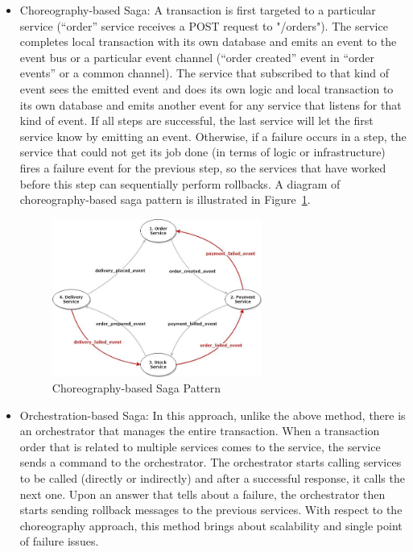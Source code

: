 \documentclass{Configuration_Files/PoliMi3i_thesis}
\begin{document}
\begin{itemize}
    \item Choreography-based Saga: A transaction is first targeted to a particular service (“order” service receives a POST request to "/orders").
    The service completes local transaction with its own database and emits an event to the event bus or a particular event channel (“order created” event in “order events” or a common channel).
    The service that subscribed to that kind of event sees the emitted event and does its own logic and local transaction to its own database and emits another event for any service that listens for that kind of event.
    If all steps are successful, the last service will let the first service know by emitting an event.
    Otherwise, if a failure occurs in a step, the service that could not get its job done (in terms of logic or infrastructure) fires a failure event for the previous step, so the services that have worked before this step can sequentially perform rollbacks.
    A diagram of choreography-based saga pattern is illustrated in Figure~\ref{fig:saga}.
    
    \begin{figure}[H]
    \centering
    \includegraphics[width=0.65\textwidth]{myImages/saga.jpeg}
    \caption{Choreography-based Saga Pattern}
    \label{fig:saga}
    \end{figure}
    
    \item Orchestration-based Saga: In this approach, unlike the above method, there is an orchestrator that manages the entire transaction.
    When a transaction order that is related to multiple services comes to the service, the service sends a command to the orchestrator.
    The orchestrator starts calling services to be called (directly or indirectly) and after a successful response, it calls the next one. Upon an answer that tells about a failure, the orchestrator then starts sending rollback messages to the previous services.
    With respect to the choreography approach, this method brings about scalability and single point of failure issues.
\end{itemize}
\end{document}
